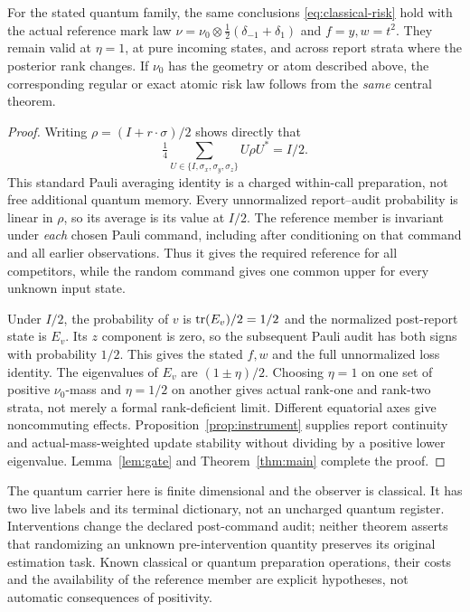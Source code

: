 \begin{theorem}\label{thm:quantum}
For the stated quantum family, the same conclusions \eqref{eq:classical-risk} hold with the actual reference mark law
$\nu=\nu_0\otimes\tfrac12(\delta_{-1}+\delta_1)$ and $f=y,w=t^2$. They remain valid at $\eta=1$, at pure incoming states, and across report strata where the posterior rank changes. If $\nu_0$ has the geometry or atom described above, the corresponding regular or exact atomic risk law follows from the \emph{same} central theorem.
\end{theorem}
\begin{proof}
Writing $\rho=(I+r\cdot\sigma)/2$ shows directly that
\[
 \tfrac14\sum_{U\in\{I,\sigma_x,\sigma_y,\sigma_z\}}U\rho U^*=I/2.
\]
This standard Pauli averaging identity \cite{AMTW} is a charged within-call preparation, not free additional quantum memory. Every unnormalized report--audit probability is linear in $\rho$, so its average is its value at $I/2$. The reference member is invariant under \emph{each} chosen Pauli command, including after conditioning on that command and all earlier observations. Thus it gives the required reference for all competitors, while the random command gives one common upper for every unknown input state.

Under $I/2$, the probability of $v$ is $\operatorname{tr}(E_v)/2=1/2$ and the normalized post-report state is $E_v$. Its $z$ component is zero, so the subsequent Pauli audit has both signs with probability $1/2$. This gives the stated $f,w$ and the full unnormalized loss identity. The eigenvalues of $E_v$ are $(1\pm\eta)/2$. Choosing $\eta=1$ on one set of positive $\nu_0$-mass and $\eta=1/2$ on another gives actual rank-one and rank-two strata, not merely a formal rank-deficient limit. Different equatorial axes give noncommuting effects. Proposition~\ref{prop:instrument} supplies report continuity and actual-mass-weighted update stability without dividing by a positive lower eigenvalue. Lemma~\ref{lem:gate} and Theorem~\ref{thm:main} complete the proof.
\end{proof}

The quantum carrier here is finite dimensional and the observer is classical. It has two live labels and its terminal dictionary, not an uncharged quantum register. Interventions change the declared post-command audit; neither theorem asserts that randomizing an unknown pre-intervention quantity preserves its original estimation task. Known classical or quantum preparation operations, their costs and the availability of the reference member are explicit hypotheses, not automatic consequences of positivity.
